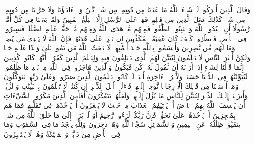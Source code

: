 \stopbuffer%
\startbuffer[\q:16:35]
وَقَالَ ٱلَّذِینَ أَشۡرَكُوا۟ لَوۡ شَاۤءَ ٱللَّهُ مَا عَبَدۡنَا مِن دُونِهِۦ مِن شَیۡءࣲ نَّحۡنُ وَلَاۤ ءَابَاۤؤُنَا وَلَا حَرَّمۡنَا مِن دُونِهِۦ مِن شَیۡءࣲۚ كَذَٰلِكَ فَعَلَ ٱلَّذِینَ مِن قَبۡلِهِمۡۚ فَهَلۡ عَلَى ٱلرُّسُلِ إِلَّا ٱلۡبَلَٰغُ ٱلۡمُبِینُ%
\stopbuffer%
\startbuffer[\q:16:36]
وَلَقَدۡ بَعَثۡنَا فِی كُلِّ أُمَّةࣲ رَّسُولًا أَنِ ٱعۡبُدُوا۟ ٱللَّهَ وَٱجۡتَنِبُوا۟ ٱلطَّٰغُوتَۖ فَمِنۡهُم مَّنۡ هَدَى ٱللَّهُ وَمِنۡهُم مَّنۡ حَقَّتۡ عَلَیۡهِ ٱلضَّلَٰلَةُۚ فَسِیرُوا۟ فِی ٱلۡأَرۡضِ فَٱنظُرُوا۟ كَیۡفَ كَانَ عَٰقِبَةُ ٱلۡمُكَذِّبِینَ%
\stopbuffer%
\startbuffer[\q:16:37]
إِن تَحۡرِصۡ عَلَىٰ هُدَىٰهُمۡ فَإِنَّ ٱللَّهَ لَا یَهۡدِی مَن یُضِلُّۖ وَمَا لَهُم مِّن نَّٰصِرِینَ%
\stopbuffer%
\startbuffer[\q:16:38]
وَأَقۡسَمُوا۟ بِٱللَّهِ جَهۡدَ أَیۡمَٰنِهِمۡ لَا یَبۡعَثُ ٱللَّهُ مَن یَمُوتُۚ بَلَىٰ وَعۡدًا عَلَیۡهِ حَقࣰّا وَلَٰكِنَّ أَكۡثَرَ ٱلنَّاسِ لَا یَعۡلَمُونَ%
\stopbuffer%
\startbuffer[\q:16:39]
لِیُبَیِّنَ لَهُمُ ٱلَّذِی یَخۡتَلِفُونَ فِیهِ وَلِیَعۡلَمَ ٱلَّذِینَ كَفَرُوۤا۟ أَنَّهُمۡ كَانُوا۟ كَٰذِبِینَ%
\stopbuffer%
\startbuffer[\q:16:40]
إِنَّمَا قَوۡلُنَا لِشَیۡءٍ إِذَاۤ أَرَدۡنَٰهُ أَن نَّقُولَ لَهُۥ كُن فَیَكُونُ%
\stopbuffer%
\startbuffer[\q:16:41]
وَٱلَّذِینَ هَاجَرُوا۟ فِی ٱللَّهِ مِنۢ بَعۡدِ مَا ظُلِمُوا۟ لَنُبَوِّئَنَّهُمۡ فِی ٱلدُّنۡیَا حَسَنَةࣰۖ وَلَأَجۡرُ ٱلۡءَاخِرَةِ أَكۡبَرُۚ لَوۡ كَانُوا۟ یَعۡلَمُونَ%
\stopbuffer%
\startbuffer[\q:16:42]
ٱلَّذِینَ صَبَرُوا۟ وَعَلَىٰ رَبِّهِمۡ یَتَوَكَّلُونَ%
\stopbuffer%
\startbuffer[\q:16:43]
وَمَاۤ أَرۡسَلۡنَا مِن قَبۡلِكَ إِلَّا رِجَالࣰا نُّوحِیۤ إِلَیۡهِمۡۖ فَسۡءَلُوۤا۟ أَهۡلَ ٱلذِّكۡرِ إِن كُنتُمۡ لَا تَعۡلَمُونَ%
\stopbuffer%
\startbuffer[\q:16:44]
بِٱلۡبَیِّنَٰتِ وَٱلزُّبُرِۗ وَأَنزَلۡنَاۤ إِلَیۡكَ ٱلذِّكۡرَ لِتُبَیِّنَ لِلنَّاسِ مَا نُزِّلَ إِلَیۡهِمۡ وَلَعَلَّهُمۡ یَتَفَكَّرُونَ%
\stopbuffer%
\startbuffer[\q:16:45]
أَفَأَمِنَ ٱلَّذِینَ مَكَرُوا۟ ٱلسَّیِّءَاتِ أَن یَخۡسِفَ ٱللَّهُ بِهِمُ ٱلۡأَرۡضَ أَوۡ یَأۡتِیَهُمُ ٱلۡعَذَابُ مِنۡ حَیۡثُ لَا یَشۡعُرُونَ%
\stopbuffer%
\startbuffer[\q:16:46]
أَوۡ یَأۡخُذَهُمۡ فِی تَقَلُّبِهِمۡ فَمَا هُم بِمُعۡجِزِینَ%
\stopbuffer%
\startbuffer[\q:16:47]
أَوۡ یَأۡخُذَهُمۡ عَلَىٰ تَخَوُّفࣲ فَإِنَّ رَبَّكُمۡ لَرَءُوفࣱ رَّحِیمٌ%
\stopbuffer%
\startbuffer[\q:16:48]
أَوَ لَمۡ یَرَوۡا۟ إِلَىٰ مَا خَلَقَ ٱللَّهُ مِن شَیۡءࣲ یَتَفَیَّؤُا۟ ظِلَٰلُهُۥ عَنِ ٱلۡیَمِینِ وَٱلشَّمَاۤئِلِ سُجَّدࣰا لِّلَّهِ وَهُمۡ دَٰخِرُونَ%
\stopbuffer%
\startbuffer[\q:16:49]
وَ̅لِ̅لَّ̅هِ̅ ̅یَ̅سۡ̅جُ̅دُ̅ مَا فِی ٱلسَّمَٰوَٰتِ وَمَا فِی ٱلۡأَرۡضِ مِن دَاۤبَّةࣲ وَٱلۡمَلَٰۤئِكَةُ وَهُمۡ لَا یَسۡتَكۡبِرُونَ%
\stopbuffer%
